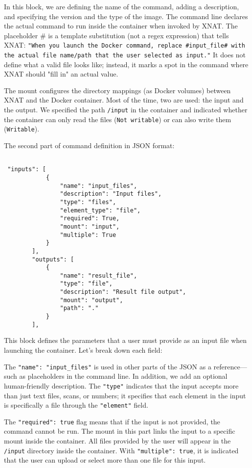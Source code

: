 In this block, we are defining the name of the command, adding a description, and specifying the version and the type of the image.
The command line declares the actual command to run inside the container when invoked by XNAT. The placeholder \# is a template substitution (not a regex expression) that tells XNAT: \texttt{"When you launch the Docker command, replace \#input\_file\# with the actual file name/path that the user selected as input."} It does not define what a valid file looks like; instead, it marks a spot in the command where XNAT should "fill in" an actual value.


The mount configures the directory mappings (as Docker volumes) between XNAT and the Docker container. Most of the time, two are used: the input and the output.
We specified the path \texttt{/input} in the container and indicated whether the container can only read the files (\texttt{Not writable}) or can also write them (\texttt{Writable}).

The second part of command definition in JSON format:


\begin{lstlisting}

 "inputs": [
            {
                "name": "input_files",
                "description": "Input files",
                "type": "files",
                "element_type": "file",
                "required": True,
                "mount": "input",
                "multiple": True
            }
        ],
        "outputs": [
            {
                "name": "result_file",
                "type": "file",
                "description": "Result file output",
                "mount": "output",
                "path": "."
            }
        ],
\end{lstlisting}


This block defines the parameters that a user must provide as an input file when launching the container.
Let’s break down each field:

The \texttt{"name": "input\_files"} is used in other parts of the JSON as a reference---such as placeholders in the command line. In addition, we add an optional human-friendly description. The \texttt{"type"} indicates that the input accepts more than just text files, scans, or numbers; it specifies that each element in the input is specifically a file through the \texttt{"element"} field.

The \texttt{"required": true} flag means that if the input is not provided, the command cannot be run. The mount in this part links the input to a specific mount inside the container. All files provided by the user will appear in the \texttt{/input} directory inside the container. With \texttt{"multiple": true}, it is indicated that the user can upload or select more than one file for this input.

